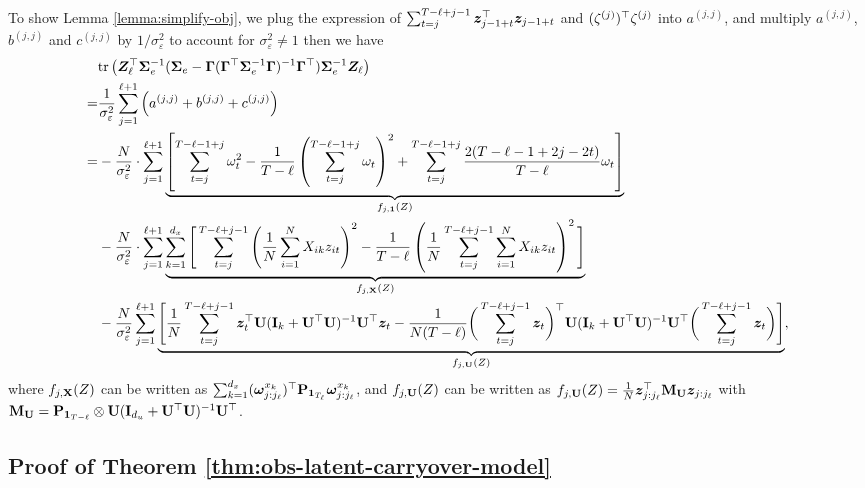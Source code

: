 		To show Lemma \ref{lemma:simplify-obj}, we plug the expression of $\sum_{t=j}^{T - \ell+j-1} \bm{z}_{j-1+t}^\top \bm{z}_{j-1+t} $ and $(\zeta^{(j)})^\top \zeta^{(j)} $ into $a^{(j,j)}$, and multiply $a^{(j,j)}$, $b^{(j,j)}$ and $c^{(j,j)}$ by $1/\sigma_\varepsilon^2$ to account for $\sigma_\varepsilon^2 \neq 1$
		then we have 
  {\small 
		\begin{align*}
		    & \mathrm{tr} \left( \bm{Z}_\ell^\top  \bm{\Sigma}^{-1}_e  ( \bm{\Sigma}_e - \bm{\Gamma} (\bm{\Gamma}^\top \bm{\Sigma}^{-1}_e  \bm{\Gamma})^{-1} \bm{\Gamma}^\top) \bm{\Sigma}^{-1}_e  \bm{Z}_\ell\right) \\
		    =&\frac{1}{\sigma_\varepsilon^2}  \sum_{j = 1}^{\ell+1} \left(a^{(j,j)} + b^{(j,j)} + c^{(j,j)} \right) \\
		  =&  -   \frac{N}{\sigma_\varepsilon^2} \cdot  \sum_{j = 1}^{\ell+1} \underbrace{\left[ \sum_{t = j}^{T - \ell-1+j} \omega_t^2  - \frac{1}{T - \ell} \left(  \sum_{t=j}^{T - \ell-1+j} \omega_t  \right)^2 +  \sum_{t = j}^{T - \ell-1+j} \frac{2(T - \ell-1+2j-2t)}{T - \ell}  \omega_t   \right]}_{f_{j,\bm{1}}(Z)}  \\
		    & -  \frac{N}{\sigma_\varepsilon^2} \cdot   \sum_{j = 1}^{\ell+1} \underbrace{\sum_{k=1}^{d_x} \Bigg[  \sum_{t=j}^{T - \ell+j-1} \left(\frac{1}{N} \sum_{i = 1}^N X_{ik} z_{it} \right)^2  - \frac{1}{T - \ell}  \left( \frac{1}{N} \sum_{t=j}^{T - \ell+j-1} \sum_{i = 1}^N X_{ik} z_{it}  \right)^2  \Bigg]}_{f_{j,\mathbf{X}}(Z)}  \\
		    & - \frac{N}{\sigma_\varepsilon^2} \sum_{j = 1}^{\ell+1} \underbrace{\Bigg[ \frac{1}{N} \sum_{t=j}^{T - \ell+j-1} \bm{z}_t^\top \mathbf{U} (\mathbf{I}_k +  \mathbf{U}^\top \mathbf{U})^{-1} \mathbf{U}^\top \bm{z}_{t} -  \frac{1}{N(T - \ell)} \bigg( \sum_{t=j}^{T - \ell+j-1} \bm{z}_t \bigg)^\top  \mathbf{U} (\mathbf{I}_k + \mathbf{U}^\top \mathbf{U})^{-1} \mathbf{U}^\top   \bigg( \sum_{t=j}^{T - \ell+j-1} \bm{z}_t \bigg)  \Bigg] }_{f_{j,\mathbf{U}}(Z)},
		\end{align*} }
		where $f_{j,\mathbf{X}}(Z) $ can be written as $ \sum_{k=1}^{d_x}  (\bm{\omega}_{j:j_\ell}^{x_k})^\top \mathbf{P}_{\bm{1}_{T_\ell}}  \bm{\omega}_{j:j_\ell}^{x_k} $, and $f_{j,\mathbf{U}}(Z) $ can be written as $f_{j,\mathbf{U}}(Z) = \frac{1}{N} \bm{z}_{j:j_\ell}^\top\mathbf{M}_{\mathbf{U}}  \bm{z}_{j:j_\ell} $ with $\mathbf{M}_{\mathbf{U}} = \mathbf{P}_{\bm{1}_{T-\ell}} \otimes \mathbf{U} (\mathbf{I}_{d_u} + \mathbf{U}^\top \mathbf{U})^{-1} \mathbf{U}^\top$.
		
	
		\Halmos
		\endproof
    
		
		\subsection{Proof of Theorem \ref{thm:obs-latent-carryover-model}}
		
